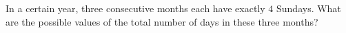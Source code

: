 In a certain year, three consecutive months each have exactly $4$ Sundays. What are the possible values of the total number of days in these three months?
